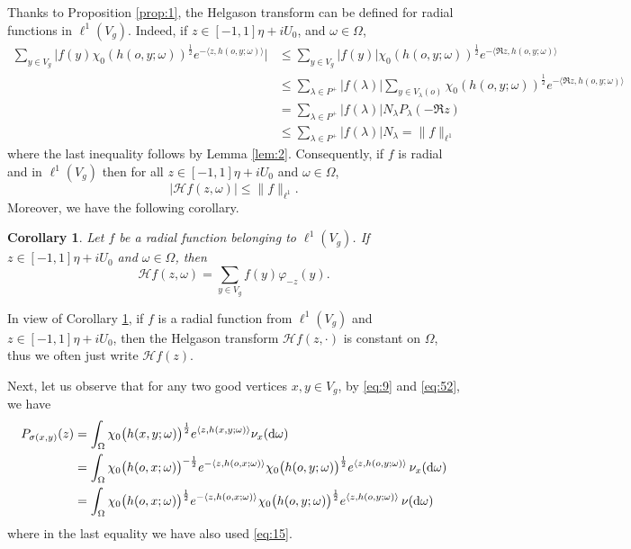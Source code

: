 \documentclass[11pt]{amsart}
\newcommand{\calH}{\mathcal{H}}
\newcommand{\vphi}{\varphi}
\newcommand{\sprod}[2]{\langle {#1}, {#2} \rangle}
\theoremstyle{plain}
\newtheorem{corollary}[theorem]{Corollary}
\theoremstyle{definition}
\numberwithin{equation}{section}
\begin{document}
Thanks to Proposition \ref{prop:1}, the Helgason transform can be defined for radial functions in $\ell^1(V_g)$. Indeed,
if $z \in [-1, 1]\eta + i U_0$, and $\omega \in \Omega$,
\begin{align*}
	\sum_{y \in V_g} \Big| f(y) \chi_0(h(o, y; \omega))^{\frac12} e^{-\sprod{z}{h(o, y; \omega)}} \Big|
	&\leqslant
	\sum_{y \in V_g} |f(y)| \chi_0(h(o, y; \omega))^{\frac12} e^{-\sprod{\Re z}{h(o, y; \omega)}} \\
	&\leqslant
	\sum_{\lambda \in P^+} |f(\lambda)| \sum_{y \in V_\lambda(o)} \chi_0(h(o, y; \omega))^{\frac12} 
	e^{-\sprod{\Re z}{h(o, y; \omega)}} \\
	&=
	\sum_{\lambda \in P^+} |f(\lambda)| N_\lambda P_{\lambda}(-\Re z) \\
	&\leqslant
	\sum_{\lambda \in P^+} |f(\lambda)| N_\lambda = \|f\|_{\ell^1}
\end{align*}
where the last inequality follows by Lemma \ref{lem:2}. Consequently, if $f$ is radial and in $\ell^1(V_g)$
then for all $z \in [-1, 1]\eta + iU_0$ and $\omega \in \Omega$,
\begin{equation}
	\label{eq:74}
	|\calH f(z, \omega)| \leqslant \|f\|_{\ell^1}.
\end{equation}
Moreover, we have the following corollary.
\begin{corollary}
	\label{cor:3}
	Let $f$ be a radial function belonging to $\ell^1(V_g)$. If $z \in [-1, 1]\eta + iU_0$ and $\omega \in \Omega$, then
	\[
		\calH f(z, \omega)
		=
		\sum_{y \in V_g} f(y) \vphi_{-z}(y).
	\]
\end{corollary}

In view of Corollary \ref{cor:3}, if $f$ is a radial function from $\ell^1(V_g)$ and $z \in [-1, 1]\eta + iU_0$, then 
the Helgason transform $\calH f(z, \cdot)$ is constant on $\Omega$, thus we often just write $\calH f(z)$.

Next, let us observe that for any two good vertices $x, y \in V_g$, by \eqref{eq:9} and \eqref{eq:52}, we have
\begin{align}
	\nonumber
	P_{\sigma(x, y)}(z)
	&= \int_\Omega \chi_0\big(h(x, y; \omega)\big)^{\frac12} e^{\sprod{z}{h(x, y; \omega)}} \nu_x({\rm d} \omega) \\
	\nonumber
	&= \int_\Omega \chi_0\big(h(o, x; \omega)\big)^{-\frac12} e^{-\sprod{z}{h(o, x; \omega)}} 
	\chi_0\big(h(o, y; \omega)\big)^{\frac12} e^{\sprod{z}{h(o, y; \omega)}} \, \nu_x({\rm d} \omega) \\
	\label{eq:2}
	&=
	\int_\Omega \chi_0\big(h(o, x; \omega)\big)^{\frac12} e^{-\sprod{z}{h(o, x; \omega)}}
    \chi_0\big(h(o, y; \omega)\big)^{\frac12} e^{\sprod{z}{h(o, y; \omega)}} \, \nu({\rm d} \omega)
\end{align}
where in the last equality we have also used \eqref{eq:15}.
\end{document}
